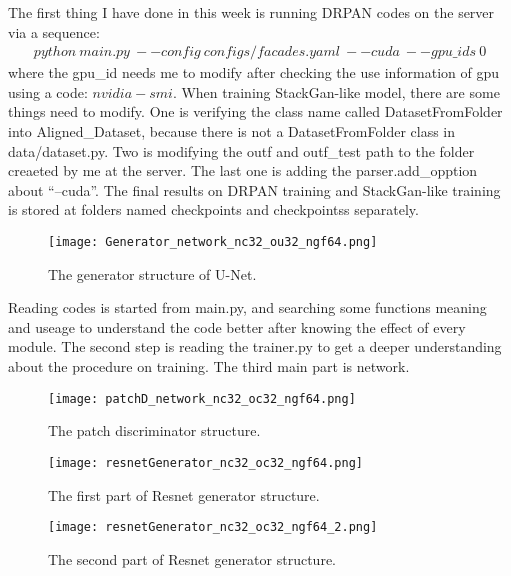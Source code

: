 \documentclass[a4paper]{article}
\begin{document}
The first thing I have done in this week is running DRPAN codes on the server via a sequence:
\begin{gather}
python~main.py~--config~configs/facades.yaml~--cuda~--gpu\_ids~0
\end{gather}
where the gpu\_id needs me to modify after checking the use information of gpu using a code: $nvidia-smi$. When training StackGan-like model, there are some things need to modify. One is verifying the class name called DatasetFromFolder into Aligned\_Dataset, because there is not a DatasetFromFolder class in data/dataset.py. Two is modifying the outf and outf\_test path to the folder creaeted by me at the server. The last one is adding the parser.add\_opption about ``--cuda''. The final results on DRPAN training and StackGan-like training is stored at folders named checkpoints and checkpointss separately.

\begin{figure}[hb]
\begin{center}
\texttt{[image: Generator\_network\_nc32\_ou32\_ngf64.png]}
\end{center}
\caption{The generator structure of U-Net.}
\label{fig3}
\end{figure}

Reading codes is started from main.py, and searching some functions meaning and useage to understand the code better after knowing the effect of every module. The second step is reading the trainer.py to get a deeper understanding about the procedure on training. The third main part is network. 

\begin{figure}[hb]
\begin{center}
\texttt{[image: patchD\_network\_nc32\_oc32\_ngf64.png]}
\end{center}
\caption{The patch discriminator structure.}
\label{fig4}
\end{figure}

\begin{figure}[hb]
\begin{center}
\texttt{[image: resnetGenerator\_nc32\_oc32\_ngf64.png]}
\end{center}
\caption{The first part of Resnet generator structure.}
\label{fig1}
\end{figure}

\begin{figure*}
\begin{center}
\texttt{[image: resnetGenerator\_nc32\_oc32\_ngf64\_2.png]}
\end{center}
\caption{The second part of Resnet generator structure.}
\label{fig2}
\end{figure*}
\end{document}
